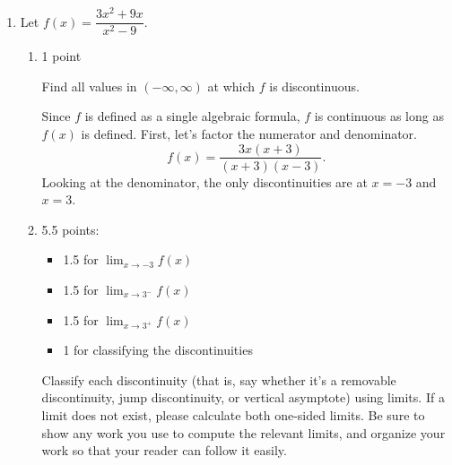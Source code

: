 \documentclass{article}
\begin{document}
\begin{enumerate}
\begin{solution}
  \end{solution}

\item \label{discontinuities-and-horizontal-asymptotes-1}

  Let $f(x) = \dfrac{3x^2 + 9x}{x^2 - 9}$.

  \begin{enumerate}
  \item \label{discontinuities-and-horizontal-asymptotes-1-discontinuities}

    \begin{grading}
      1 point
    \end{grading}

    \begin{problem}[0.75in]
      Find all values in $(-\infty, \infty)$ at which $f$ is discontinuous. 
    \end{problem}

    \begin{solution}
      Since $f$ is defined as a single algebraic formula, $f$ is continuous
      as long as $f(x)$ is defined. First, let's factor the numerator and denominator.
      \[f(x) = \frac{3x(x+3)}{(x+3)(x-3)}.\]
      Looking at the denominator, the only discontinuities
      are at $x = -3$ and $x=3$. 
    \end{solution}

  \item

    \begin{grading}
      5.5 points:
      \begin{itemize}[nosep]
      \item 1.5 for $\displaystyle \lim_{x \to -3} f(x)$
      \item 1.5 for $\displaystyle \lim_{x \to 3^-} f(x)$
      \item 1.5 for $\displaystyle \lim_{x \to 3^+} f(x)$
      \item 1 for classifying the discontinuities 
      \end{itemize}
    \end{grading}

    \begin{problem}[\vfill\newpage]
      Classify each discontinuity (that is, say whether it's a removable discontinuity, jump discontinuity, or vertical asymptote) using limits. If a limit does not exist, please calculate both one-sided limits. Be sure to show any work you use to compute the relevant limits, and organize your work so that your reader can follow it easily. 
    \end{problem}


\end{enumerate}
\end{enumerate}
\end{document}
